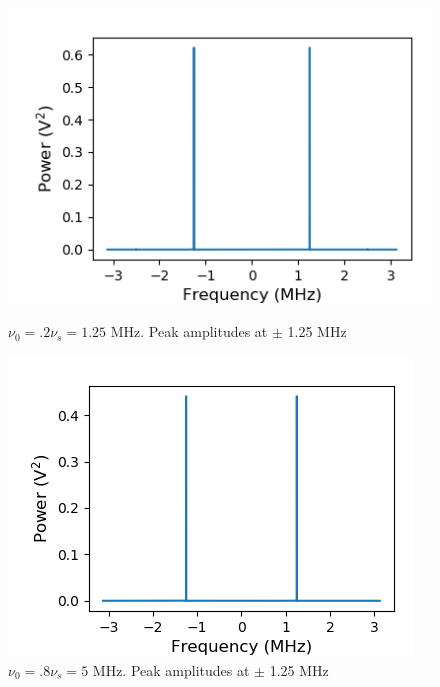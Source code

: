 \documentclass[a4paper]{article}
\begin{document}

\begin{figure}
\centering
\begin{minipage}{.5\textwidth}
	\centering
	\includegraphics[width=.8\linewidth]{5-2/pow2}
	\caption{$\nu_0 = .2 \nu_s = 1.25$ MHz. Peak amplitudes at $\pm$ 1.25 MHz}
	\label{fig:NyPw2}
\end{minipage}%
\begin{minipage}{.5\textwidth}
	\centering
	\includegraphics[width=.8\linewidth]{5-2/pow8}
	\caption{$\nu_0 = .8 \nu_s = 5$ MHz. Peak amplitudes at $\pm$ 1.25 MHz}
	\label{fig:NyPw8}
\end{minipage}
\end{figure}
\end{document}
